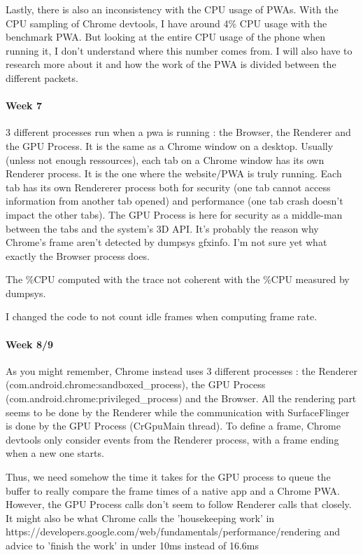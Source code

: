 \documentclass{kththesis}
\begin{document}
Lastly, there is also an inconsistency with the CPU usage of PWAs. With the CPU sampling of Chrome devtools, I have around 4\% CPU usage with the benchmark PWA. But looking at the entire CPU usage of the phone when running it, I don't understand where this number comes from. I will also have to research more about it and how the work of the PWA is divided between the different packets.

\paragraph{Week 7}
3 different processes run when a pwa is running : the Browser, the Renderer and the GPU Process. It is the same as a Chrome window on a desktop. Usually (unless not enough ressources), each tab on a Chrome window has its own Renderer process. It is the one where the website/PWA is truly running. Each tab has its own Rendererer process both for security (one tab cannot access information from another tab opened) and performance (one tab crash doesn't impact the other tabs). The GPU Process is here for security as a middle-man between the tabs and the system's 3D API. It's probably the reason why Chrome's frame aren't detected by dumpsys gfxinfo. I'm not sure yet what exactly the Browser process does.

The \%CPU computed with the trace not coherent with the \%CPU measured by dumpsys.

I changed the code to not count idle frames when computing frame rate. 
\newline

\paragraph{Week 8/9}
As you might remember, Chrome instead uses 3 different processes : the Renderer (com.android.chrome:sandboxed\_process), the GPU Process (com.android.chrome:privileged\_process) and the Browser. All the rendering part seems to be done by the Renderer while the communication with SurfaceFlinger is done by the GPU Process (CrGpuMain thread). To define a frame, Chrome devtools only consider events from the Renderer process, with a frame ending when a new one starts.

Thus, we need somehow the time it takes for the GPU process to queue the buffer to really compare the frame times of a native app and a Chrome PWA. However, the GPU Process calls don't seem to follow Renderer calls that closely. It might also be what Chrome calls the 'housekeeping work' in https://developers.google.com/web/fundamentals/performance/rendering and advice to 'finish the work' in under 10ms instead of 16.6ms
\end{document}
